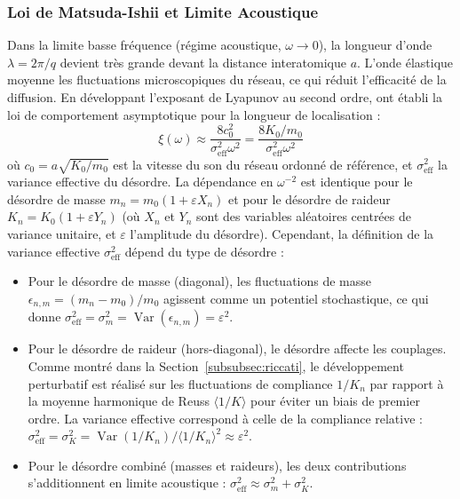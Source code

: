 \documentclass[11pt, a4paper, twoside]{article}
\begin{document}
\subsubsection{Loi de Matsuda-Ishii et Limite Acoustique}
Dans la limite basse fréquence (régime acoustique, $\omega \to 0$), la longueur d'onde $\lambda = 2\pi/q$ devient très grande devant la distance interatomique $a$. L'onde élastique moyenne les fluctuations microscopiques du réseau, ce qui réduit l'efficacité de la diffusion. En développant l'exposant de Lyapunov au second ordre, \textcite{matsuda1970localization} ont établi la loi de comportement asymptotique pour la longueur de localisation :
\begin{equation}\label{eq:matsuda_law}
    \xi(\omega) \approx \frac{8 c_0^2}{\sigma_{\mathrm{eff}}^2 \omega^2} = \frac{8 K_0/m_0}{\sigma_{\mathrm{eff}}^2 \omega^2}
\end{equation}
où $c_0 = a\sqrt{K_0/m_0}$ est la vitesse du son du réseau ordonné de référence, et $\sigma_{\mathrm{eff}}^2$ la variance effective du désordre. La dépendance en $\omega^{-2}$ est identique pour le désordre de masse $m_n = m_0(1+\varepsilon X_n)$ et pour le désordre de raideur $K_n = K_0(1+\varepsilon Y_n)$ (où $X_n$ et $Y_n$ sont des variables aléatoires centrées de variance unitaire, et $\varepsilon$ l'amplitude du désordre). Cependant, la définition de la variance effective $\sigma_{\mathrm{eff}}^2$ dépend du type de désordre :
\begin{itemize}
    \item Pour le désordre de masse (diagonal), les fluctuations de masse $\epsilon_{n,m} = (m_n - m_0)/m_0$ agissent comme un potentiel stochastique, ce qui donne $\sigma_{\mathrm{eff}}^2 = \sigma_m^2 = \operatorname{Var}(\epsilon_{n,m}) = \varepsilon^2$.
    \item Pour le désordre de raideur (hors-diagonal), le désordre affecte les couplages. Comme montré dans la Section~\ref{subsubsec:riccati}, le développement perturbatif est réalisé sur les fluctuations de compliance $1/K_n$ par rapport à la moyenne harmonique de Reuss $\langle 1/K \rangle$ pour éviter un biais de premier ordre. La variance effective correspond à celle de la compliance relative : $\sigma_{\mathrm{eff}}^2 = \sigma_K^2 = \operatorname{Var}(1/K_n) / \langle 1/K_n \rangle^2 \approx \varepsilon^2$.
    \item Pour le désordre combiné (masses et raideurs), les deux contributions s'additionnent en limite acoustique : $\sigma_{\mathrm{eff}}^2 \approx \sigma_m^2 + \sigma_K^2$.
\end{itemize}
\end{document}
